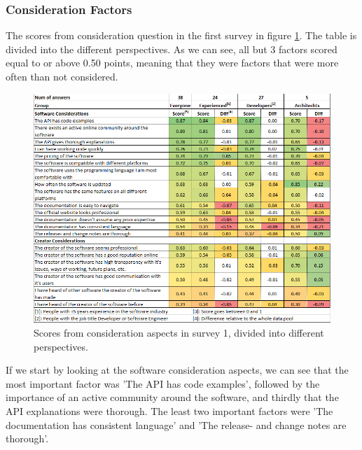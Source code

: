 \documentclass{article}
\begin{document}
\subsubsection{Consideration Factors}
The scores from consideration question in the first survey in figure \ref{fig:scopresByPoints}. The table is divided into the different perspectives.
As we can see, all but 3 factors scored equal to or above 0.50 points, meaning that they
were factors that were more often than not considered.
\begin{figure}[h]
\centering
\includegraphics[width=\linewidth]{ScoresByPoints.png}
\caption{Scores from consideration aspects in survey 1, divided into different perspectives.}
\label{fig:scopresByPoints}
\end{figure}
If we start by looking at the software consideration aspects, we can see that the most important
factor was 'The API has code examples', followed by the importance of an
active community around the software, and thirdly that the API
explanations were thorough. The least two important factors were 'The
documentation has consistent language' and 'The release- and change
notes are thorough'.
\end{document}
